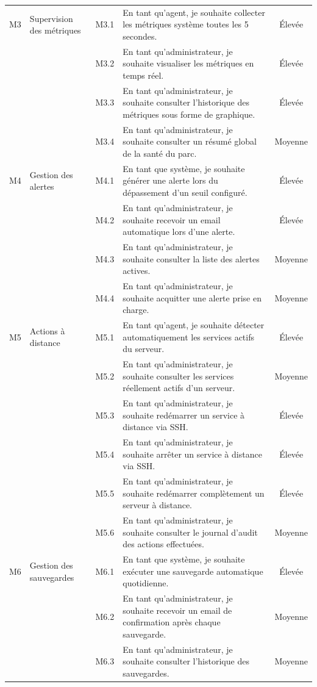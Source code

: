 \begin{longtable}{|c|>{\raggedright\arraybackslash}p{2.6cm}|c|>{\raggedright\arraybackslash}p{6.2cm}|c|}
M3 & Supervision des métriques
& M3.1 & En tant qu'agent, je souhaite collecter les métriques système toutes les 5 secondes. & Élevée \\
& & M3.2 & En tant qu'administrateur, je souhaite visualiser les métriques en temps réel. & Élevée \\
& & M3.3 & En tant qu'administrateur, je souhaite consulter l'historique des métriques sous forme de graphique. & Élevée \\
& & M3.4 & En tant qu'administrateur, je souhaite consulter un résumé global de la santé du parc. & Moyenne \\
\hline

M4 & Gestion des alertes
& M4.1 & En tant que système, je souhaite générer une alerte lors du dépassement d'un seuil configuré. & Élevée \\
& & M4.2 & En tant qu'administrateur, je souhaite recevoir un email automatique lors d'une alerte. & Élevée \\
& & M4.3 & En tant qu'administrateur, je souhaite consulter la liste des alertes actives. & Moyenne \\
& & M4.4 & En tant qu'administrateur, je souhaite acquitter une alerte prise en charge. & Moyenne \\
\hline

M5 & Actions à distance
& M5.1 & En tant qu'agent, je souhaite détecter automatiquement les services actifs du serveur. & Élevée \\
& & M5.2 & En tant qu'administrateur, je souhaite consulter les services réellement actifs d'un serveur. & Moyenne \\
& & M5.3 & En tant qu'administrateur, je souhaite redémarrer un service à distance via SSH. & Élevée \\
& & M5.4 & En tant qu'administrateur, je souhaite arrêter un service à distance via SSH. & Élevée \\
& & M5.5 & En tant qu'administrateur, je souhaite redémarrer complètement un serveur à distance. & Élevée \\
& & M5.6 & En tant qu'administrateur, je souhaite consulter le journal d'audit des actions effectuées. & Moyenne \\
\hline

M6 & Gestion des sauvegardes
& M6.1 & En tant que système, je souhaite exécuter une sauvegarde automatique quotidienne. & Élevée \\
& & M6.2 & En tant qu'administrateur, je souhaite recevoir un email de confirmation après chaque sauvegarde. & Moyenne \\
& & M6.3 & En tant qu'administrateur, je souhaite consulter l'historique des sauvegardes. & Moyenne \\
\hline


\end{longtable}
